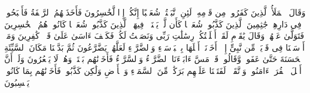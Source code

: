 \stopbuffer
\startbuffer[\q:7:90]
وَقَالَ ٱلۡمَلَأُ ٱلَّذِینَ كَفَرُوا۟ مِن قَوۡمِهِۦ لَئِنِ ٱتَّبَعۡتُمۡ شُعَیۡبًا إِنَّكُمۡ إِذࣰا لَّخَٰسِرُونَ%
\stopbuffer
\startbuffer[\q:7:91]
فَأَخَذَتۡهُمُ ٱلرَّجۡفَةُ فَأَصۡبَحُوا۟ فِی دَارِهِمۡ جَٰثِمِینَ%
\stopbuffer
\startbuffer[\q:7:92]
ٱلَّذِینَ كَذَّبُوا۟ شُعَیۡبࣰا كَأَن لَّمۡ یَغۡنَوۡا۟ فِیهَاۚ ٱلَّذِینَ كَذَّبُوا۟ شُعَیۡبࣰا كَانُوا۟ هُمُ ٱلۡخَٰسِرِینَ%
\stopbuffer
\startbuffer[\q:7:93]
فَتَوَلَّىٰ عَنۡهُمۡ وَقَالَ یَٰقَوۡمِ لَقَدۡ أَبۡلَغۡتُكُمۡ رِسَٰلَٰتِ رَبِّی وَنَصَحۡتُ لَكُمۡۖ فَكَیۡفَ ءَاسَىٰ عَلَىٰ قَوۡمࣲ كَٰفِرِینَ%
\stopbuffer
\startbuffer[\q:7:94]
وَمَاۤ أَرۡسَلۡنَا فِی قَرۡیَةࣲ مِّن نَّبِیٍّ إِلَّاۤ أَخَذۡنَاۤ أَهۡلَهَا بِٱلۡبَأۡسَاۤءِ وَٱلضَّرَّاۤءِ لَعَلَّهُمۡ یَضَّرَّعُونَ%
\stopbuffer
\startbuffer[\q:7:95]
ثُمَّ بَدَّلۡنَا مَكَانَ ٱلسَّیِّئَةِ ٱلۡحَسَنَةَ حَتَّىٰ عَفَوا۟ وَّقَالُوا۟ قَدۡ مَسَّ ءَابَاۤءَنَا ٱلضَّرَّاۤءُ وَٱلسَّرَّاۤءُ فَأَخَذۡنَٰهُم بَغۡتَةࣰ وَهُمۡ لَا یَشۡعُرُونَ%
\stopbuffer
\startbuffer[\q:7:96]
وَلَوۡ أَنَّ أَهۡلَ ٱلۡقُرَىٰۤ ءَامَنُوا۟ وَٱتَّقَوۡا۟ لَفَتَحۡنَا عَلَیۡهِم بَرَكَٰتࣲ مِّنَ ٱلسَّمَاۤءِ وَٱلۡأَرۡضِ وَلَٰكِن كَذَّبُوا۟ فَأَخَذۡنَٰهُم بِمَا كَانُوا۟ یَكۡسِبُونَ%
\stopbuffer
